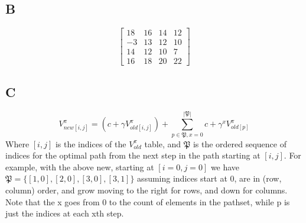 \documentclass{article}
\begin{document}
\subsection{B}
\[
\begin{bmatrix}
	18 & 16 & 14 & 12 \\
	-3 & 13 & 12 & 10 \\
	14 & 12 & 10 & 7 \\
	16 & 18 & 20 & 22
\end{bmatrix}
\]

\subsection{C}
\[
	V^{\pi}_{new[i,j]} = (c +\gamma V^{\pi}_{old[i,j]}) + \displaystyle\sum^{|\mathfrak{P}|}_{p \in \mathfrak{P}, x = 0} c + \gamma^x V^{\pi}_{old[p]}
\]
Where $[i,j]$ is the indices of the $V^{\pi}_{old}$ table, and $\mathfrak{P}$ is the ordered sequence of indices for the optimal path from the next step in the path starting at $[i,j]$.
For example, with the above new, starting at $[i=0,j=0]$ we have $\mathfrak{P}=
\{[1,0], [2,0], [3,0],[3,1]\}$ assuming indices start at 0, are in (row, column)
order, and grow moving to the right for rows, and down for columns.
Note that the x goes from 0 to the count of elements in the pathset, while p is
just the indices at each xth step.
\end{document}
